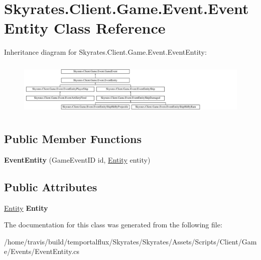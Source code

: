 \hypertarget{class_skyrates_1_1_client_1_1_game_1_1_event_1_1_event_entity}{\section{Skyrates.\-Client.\-Game.\-Event.\-Event\-Entity Class Reference}
\label{class_skyrates_1_1_client_1_1_game_1_1_event_1_1_event_entity}
}
Inheritance diagram for Skyrates.\-Client.\-Game.\-Event.\-Event\-Entity\-:\begin{figure}[H]
\begin{center}
\leavevmode
\includegraphics[height=2.651515cm]{class_skyrates_1_1_client_1_1_game_1_1_event_1_1_event_entity}
\end{center}
\end{figure}
\subsection*{Public Member Functions}
\begin{DoxyCompactItemize}
\item 
\hypertarget{class_skyrates_1_1_client_1_1_game_1_1_event_1_1_event_entity_a77d59c0c91fcf217be56b799df3e33e0}{{\bfseries Event\-Entity} (Game\-Event\-I\-D id, \hyperlink{class_skyrates_1_1_common_1_1_entity_1_1_entity}{Entity} entity)}\label{class_skyrates_1_1_client_1_1_game_1_1_event_1_1_event_entity_a77d59c0c91fcf217be56b799df3e33e0}

\end{DoxyCompactItemize}
\subsection*{Public Attributes}
\begin{DoxyCompactItemize}
\item 
\hypertarget{class_skyrates_1_1_client_1_1_game_1_1_event_1_1_event_entity_a767b74cd0c7d48660ab31d72600f6e58}{\hyperlink{class_skyrates_1_1_common_1_1_entity_1_1_entity}{Entity} {\bfseries Entity}}\label{class_skyrates_1_1_client_1_1_game_1_1_event_1_1_event_entity_a767b74cd0c7d48660ab31d72600f6e58}

\end{DoxyCompactItemize}


The documentation for this class was generated from the following file\-:\begin{DoxyCompactItemize}
\item 
/home/travis/build/temportalflux/\-Skyrates/\-Skyrates/\-Assets/\-Scripts/\-Client/\-Game/\-Events/Event\-Entity.\-cs\end{DoxyCompactItemize}
